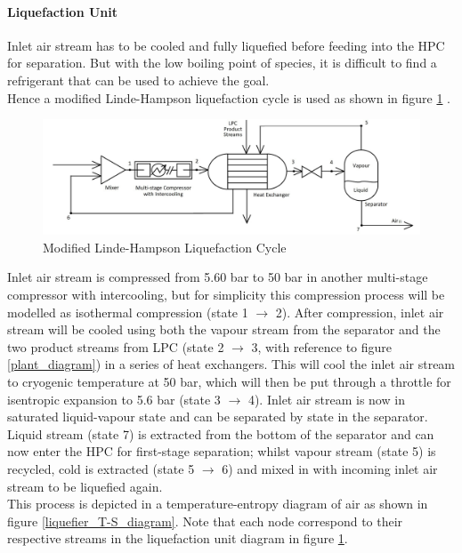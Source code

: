 \documentclass[11pt,oneside]{article}
\let\subsubsubsection\paragraph
\begin{document}
        \subsubsubsection{Liquefaction Unit}
        Inlet air stream has to be cooled and fully liquefied before feeding into the HPC for separation. But with the low boiling point of species, it is difficult to find a refrigerant that can be used to achieve the goal. \\
        Hence a modified Linde-Hampson liquefaction cycle is used as shown in figure \ref{labelled_liquefier_diagram} \citep{barron1985}. \\
        \begin{figure}[H]
            \centering
            \includegraphics[scale=0.4]{labelled_liquefier_diagram.jpg}
            \caption{Modified Linde-Hampson Liquefaction Cycle}
            \label{labelled_liquefier_diagram}
        \end{figure}
        \noindent Inlet air stream is compressed from 5.60 bar to 50 bar in another multi-stage compressor with intercooling, but for simplicity this compression process will be modelled as isothermal compression (state 1 $\rightarrow$ 2). After compression, inlet air stream will be cooled using both the vapour stream from the separator and the two product streams from LPC (state 2 $\rightarrow$ 3, with reference to figure \ref{plant_diagram}) in a series of heat exchangers. This will cool the inlet air stream to cryogenic temperature at 50 bar, which will then be put through a throttle for isentropic expansion to 5.6 bar (state 3 $\rightarrow$ 4). Inlet air stream is now in saturated liquid-vapour state and can be separated by state in the separator. Liquid stream (state 7) is extracted from the bottom of the separator and can now enter the HPC for first-stage separation; whilst vapour stream (state 5) is recycled, cold is extracted (state 5 $\rightarrow$ 6) and mixed in with incoming inlet air stream to be liquefied again. \\
        This process is depicted in a temperature-entropy diagram of air as shown in figure \ref{liquefier_T-S_diagram}. Note that each node correspond to their respective streams in the liquefaction unit diagram in figure \ref{labelled_liquefier_diagram}. \\
\end{document}
